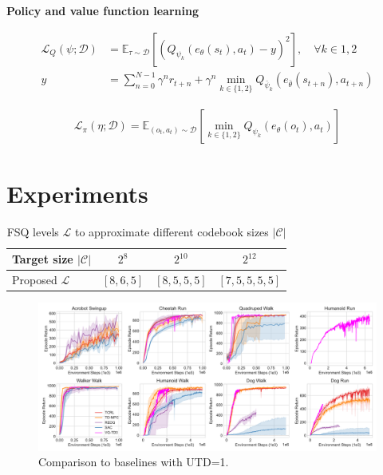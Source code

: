 \documentclass{article}
\theoremstyle{plain}
\theoremstyle{definition}
\theoremstyle{remark}
\newcommand{\E}{\mathbb{E}}
\begin{document}
\textbf{Policy and value function learning}

\begin{align} \label{eq:value-loss}
  \mathcal{L}_{Q}(\psi ; \mathcal{D}) &= \E_{\tau \sim \mathcal{D}} \left[ (Q_{\psi_{k}}(e_{\theta}(s_{t}), a_{t}) - y)^{2}  \right], \quad \forall k \in 1, 2 \\
  y &= \sum_{n=0}^{N-1} \gamma^{n} r_{t+n} + \gamma^{n} \min_{k \in \{1,2\}} Q_{\bar{\psi}_{k}}(e_{\bar{\theta}}(s_{t+n}), a_{t+n})
\end{align}


\begin{align} \label{eq:policy-loss}
 \mathcal{L}_{\pi}(\eta; \mathcal{D}) = \E_{(o_{t}, a_{t}) \sim \mathcal{D}} \left[ \min_{k\in\{1,2\}} Q_{\psi_{k}}(e_{\theta}(o_{t}), a_{t}) \right]
\end{align}

\section{Experiments}
\label{sec:experiments}

\begin{table}[t]
\caption{FSQ levels $\mathcal{L}$ to approximate different codebook sizes $|\mathcal{C}|$}
\label{sample-table}
\vskip 0.15in
\begin{center}
\begin{small}
\begin{sc}
\begin{tabular}{lccc}
\toprule
Target size $|\mathcal{C}|$ & $2^{8}$ & $2^{10}$ & $2^{12}$ \\
\midrule
Proposed $\mathcal{L}$ & $[8,6,5]$ & $[8,5,5,5]$ & $[7,5,5,5,5]$ \\
\end{tabular}
\end{sc}
\end{small}
\end{center}
\vskip -0.1in
\end{table}


\begin{figure}[ht]
\vskip 0.2in
\begin{center}
\centerline{\includegraphics[width=1.0\textwidth]{./figs/main_plot.pdf}}
\caption{Comparison to baselines with UTD=1.}
\label{fig:main_plot}
\end{center}
\vskip -0.2in
\end{figure}
\end{document}
